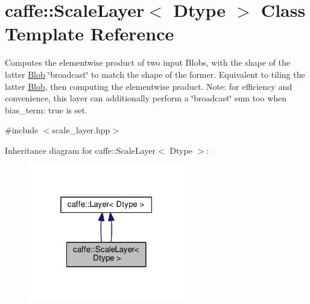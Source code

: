 \hypertarget{classcaffe_1_1_scale_layer}{}\section{caffe\+:\+:Scale\+Layer$<$ Dtype $>$ Class Template Reference}
\label{classcaffe_1_1_scale_layer}


Computes the elementwise product of two input Blobs, with the shape of the latter \mbox{\hyperlink{classcaffe_1_1_blob}{Blob}} \char`\"{}broadcast\char`\"{} to match the shape of the former. Equivalent to tiling the latter \mbox{\hyperlink{classcaffe_1_1_blob}{Blob}}, then computing the elementwise product. Note\+: for efficiency and convenience, this layer can additionally perform a \char`\"{}broadcast\char`\"{} sum too when {\ttfamily bias\+\_\+term\+: true} is set.  




{\ttfamily \#include $<$scale\+\_\+layer.\+hpp$>$}



Inheritance diagram for caffe\+:\+:Scale\+Layer$<$ Dtype $>$\+:
\nopagebreak
\begin{figure}[H]
\begin{center}
\leavevmode
\includegraphics[width=193pt]{classcaffe_1_1_scale_layer__inherit__graph}
\end{center}
\end{figure}

